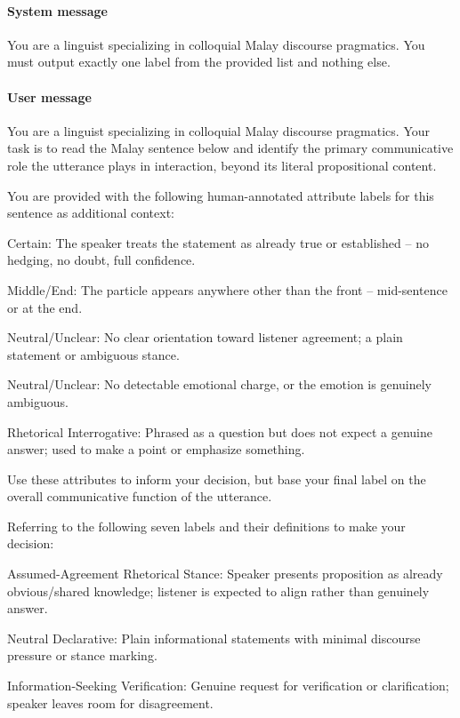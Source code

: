 \documentclass[11pt]{article}
\begin{document}
\paragraph{System message}
\begin{PromptBlock}
You are a linguist specializing in colloquial Malay discourse pragmatics. You must output exactly one label from the provided list and nothing else.
\end{PromptBlock}

\paragraph{User message}
\begin{PromptBlock}
You are a linguist specializing in colloquial Malay discourse pragmatics. Your task is to read the Malay sentence below and identify the primary communicative role the utterance plays in interaction, beyond its literal propositional content.

You are provided with the following human-annotated attribute labels for this sentence as additional context:

Certain: The speaker treats the statement as already true or established -- no hedging, no doubt, full confidence.

Middle/End: The particle appears anywhere other than the front -- mid-sentence or at the end.

Neutral/Unclear: No clear orientation toward listener agreement; a plain statement or ambiguous stance.

Neutral/Unclear: No detectable emotional charge, or the emotion is genuinely ambiguous.

Rhetorical Interrogative: Phrased as a question but does not expect a genuine answer; used to make a point or emphasize something.

Use these attributes to inform your decision, but base your final label on the overall communicative function of the utterance.

Referring to the following seven labels and their definitions to make your decision:

Assumed-Agreement Rhetorical Stance: Speaker presents proposition as already obvious/shared knowledge; listener is expected to align rather than genuinely answer.

Neutral Declarative: Plain informational statements with minimal discourse pressure or stance marking.

Information-Seeking Verification: Genuine request for verification or clarification; speaker leaves room for disagreement.


\end{PromptBlock}
\end{document}
